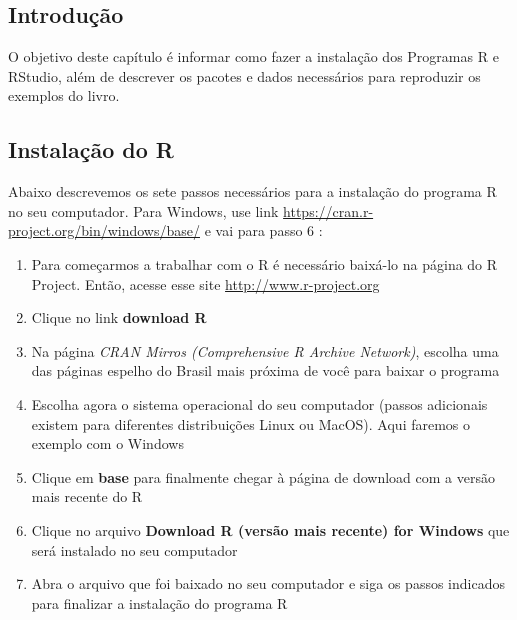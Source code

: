\documentclass[
]{article}
\providecommand{\tightlist}{%
  \setlength{\itemsep}{0pt}\setlength{\parskip}{0pt}}
\begin{document}
\hypertarget{introduuxe7uxe3o-1}{%
\subsection{Introdução}\label{introduuxe7uxe3o-1}}

O objetivo deste capítulo é informar como fazer a instalação dos Programas R e RStudio, além de descrever os pacotes e dados necessários para reproduzir os exemplos do livro.

\hypertarget{instalauxe7uxe3o-do-r}{%
\subsection{Instalação do R}\label{instalauxe7uxe3o-do-r}}

Abaixo descrevemos os sete passos necessários para a instalação do programa R no seu computador. Para Windows, use link \url{https://cran.r-project.org/bin/windows/base/} e vai para passo 6 :

\begin{enumerate}
\def\labelenumi{\arabic{enumi}.}
\tightlist
\item
  Para começarmos a trabalhar com o R é necessário baixá-lo na página do R Project. Então, acesse esse site \url{http://www.r-project.org}
\item
  Clique no link \textbf{download R}
\item
  Na página \emph{CRAN Mirros (Comprehensive R Archive Network)}, escolha uma das páginas espelho do Brasil mais próxima de você para baixar o programa
\item
  Escolha agora o sistema operacional do seu computador (passos adicionais existem para diferentes distribuições Linux ou MacOS). Aqui faremos o exemplo com o Windows
\item
  Clique em \textbf{base} para finalmente chegar à página de download com a versão mais recente do R
\item
  Clique no arquivo \textbf{Download R (versão mais recente) for Windows} que será instalado no seu computador
\item
  Abra o arquivo que foi baixado no seu computador e siga os passos indicados para finalizar a instalação do programa R
\end{enumerate}
\end{document}
